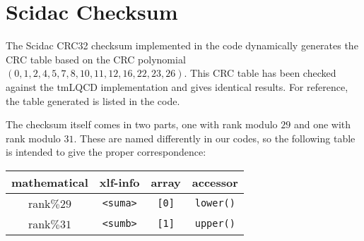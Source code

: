 \documentclass[a4paper,10pt]{article}
\begin{document}
\section{Scidac Checksum}
The Scidac CRC32 checksum implemented in the code dynamically generates the CRC table based on the CRC polynomial $(0, 1, 2, 4, 5, 7, 8, 10, 11, 12, 16, 22, 23, 26)$. This CRC table has been checked against the tmLQCD implementation and gives identical results. For reference, the table generated is listed in the code.

The checksum itself comes in two parts, one with rank modulo $29$ and one with rank modulo $31$. These are named differently in our codes, so the following table is intended to give the proper correspondence:

\begin{tabular}{|c|c|c|c|}
\hline
 mathematical & xlf-info & array & accessor \\
\hline
 rank$\%29$ & \verb|<suma>| & \verb|[0]| & \verb|lower()| \\
 rank$\%31$ & \verb|<sumb>| & \verb|[1]| & \verb|upper()| \\
\hline
\end{tabular}
\end{document}
